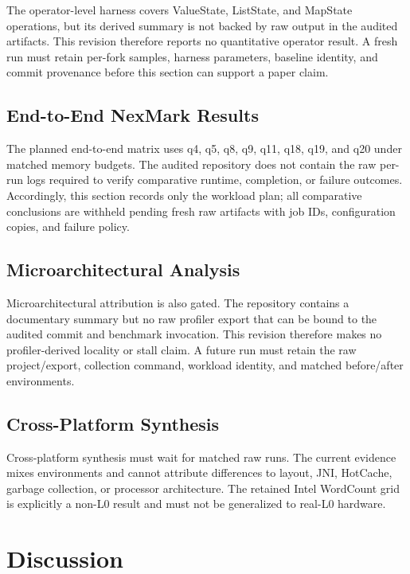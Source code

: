 \documentclass[journal]{IEEEtran}
\begin{document}
The operator-level harness covers ValueState, ListState, and MapState operations, but its derived summary is not backed by raw output in the audited artifacts. This revision therefore reports no quantitative operator result. A fresh run must retain per-fork samples, harness parameters, baseline identity, and commit provenance before this section can support a paper claim.

\subsection{End-to-End NexMark Results}

The planned end-to-end matrix uses q4, q5, q8, q9, q11, q18, q19, and q20 under matched memory budgets. The audited repository does not contain the raw per-run logs required to verify comparative runtime, completion, or failure outcomes. Accordingly, this section records only the workload plan; all comparative conclusions are withheld pending fresh raw artifacts with job IDs, configuration copies, and failure policy.

\subsection{Microarchitectural Analysis}

Microarchitectural attribution is also gated. The repository contains a documentary summary but no raw profiler export that can be bound to the audited commit and benchmark invocation. This revision therefore makes no profiler-derived locality or stall claim. A future run must retain the raw project/export, collection command, workload identity, and matched before/after environments.

\subsection{Cross-Platform Synthesis}

Cross-platform synthesis must wait for matched raw runs. The current evidence mixes environments and cannot attribute differences to layout, JNI, HotCache, garbage collection, or processor architecture. The retained Intel WordCount grid is explicitly a non-L0 result and must not be generalized to real-L0 hardware.

\section{Discussion}
\end{document}
